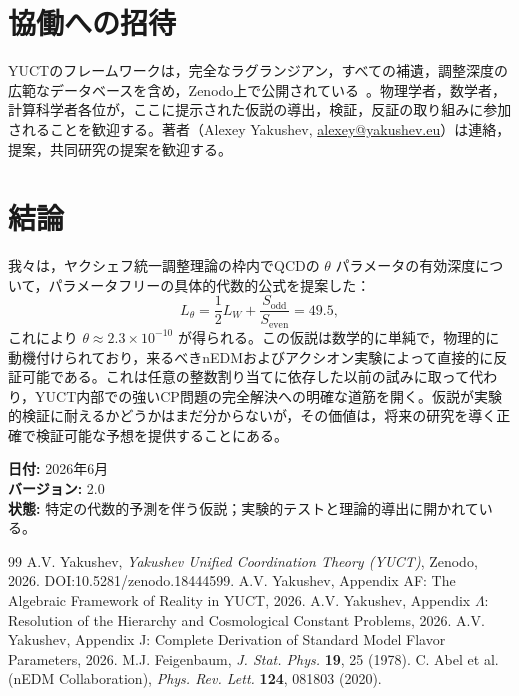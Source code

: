 \documentclass[11pt,a4paper]{article}
\begin{document}
	\section{協働への招待}
	\label{sec:invite}
	
	YUCTのフレームワークは，完全なラグランジアン，すべての補遺，調整深度の広範なデータベースを含め，Zenodo上で公開されている~\cite{Y1,Y2}。物理学者，数学者，計算科学者各位が，ここに提示された仮説の導出，検証，反証の取り組みに参加されることを歓迎する。著者（Alexey Yakushev, \href{mailto:alexey@yakushev.eu}{alexey@yakushev.eu}）は連絡，提案，共同研究の提案を歓迎する。
	
	\section{結論}
	\label{sec:conclusion}
	
	我々は，ヤクシェフ統一調整理論の枠内でQCDの \(\theta\) パラメータの有効深度について，パラメータフリーの具体的代数的公式を提案した：
	\[
	L_\theta = \frac{1}{2}L_W + \frac{S_{\mathrm{odd}}}{S_{\mathrm{even}}} = 49.5,
	\]
	これにより \(\theta \approx 2.3 \times 10^{-10}\) が得られる。この仮説は数学的に単純で，物理的に動機付けられており，来るべきnEDMおよびアクシオン実験によって直接的に反証可能である。これは任意の整数割り当てに依存した以前の試みに取って代わり，YUCT内部での強いCP問題の完全解決への明確な道筋を開く。仮説が実験的検証に耐えるかどうかはまだ分からないが，その価値は，将来の研究を導く正確で検証可能な予想を提供することにある。
	
	\vspace{1cm}
	\noindent\textbf{日付:} 2026年6月\\
	\textbf{バージョン:} 2.0\\
	\textbf{状態:} 特定の代数的予測を伴う仮説；実験的テストと理論的導出に開かれている。
	
	
	\begin{thebibliography}{99}
		 A.V. Yakushev, \textit{Yakushev Unified Coordination Theory (YUCT)}, Zenodo, 2026. DOI:10.5281/zenodo.18444599.
		 A.V. Yakushev, Appendix AF: The Algebraic Framework of Reality in YUCT, 2026.
		 A.V. Yakushev, Appendix \(\Lambda\): Resolution of the Hierarchy and Cosmological Constant Problems, 2026.
		 A.V. Yakushev, Appendix J: Complete Derivation of Standard Model Flavor Parameters, 2026.
		 M.J. Feigenbaum, \textit{J. Stat. Phys.} \textbf{19}, 25 (1978).
		 C. Abel et al. (nEDM Collaboration), \textit{Phys. Rev. Lett.} \textbf{124}, 081803 (2020).
	\end{thebibliography}
	
\end{document}
